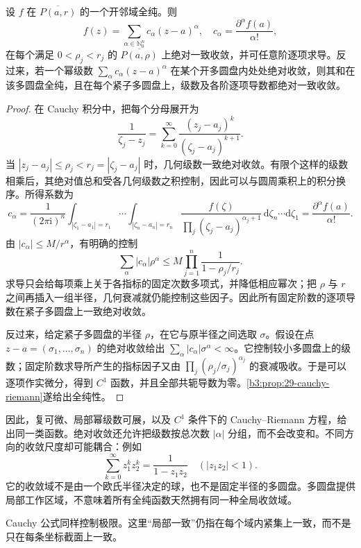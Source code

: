 \begin{theorem}[局部幂级数表示]\label{b3:thm:29-power-series}
设 \(f\) 在 \(\overline{P(a,r)}\) 的一个开邻域全纯。则
\[
 f(z)=\sum_{\alpha\in\mathbb N_0^n}c_\alpha(z-a)^\alpha,
 \quad c_\alpha=\frac{\partial^\alpha f(a)}{\alpha!},
\]
在每个满足 \(0<\rho_j<r_j\) 的 \(\overline{P(a,\rho)}\) 上绝对一致收敛，并可任意阶逐项求导。反过来，若一个幂级数 \(\sum_\alpha c_\alpha(z-a)^\alpha\) 在某个开多圆盘内处处绝对收敛，则其和在该多圆盘全纯，且在每个紧子多圆盘上，级数及各阶逐项导数都绝对一致收敛。
\end{theorem}
\begin{proof}
在 Cauchy 积分中，把每个分母展开为
\[
 \frac1{\zeta_j-z_j}
 =\sum_{k=0}^\infty\frac{(z_j-a_j)^k}{(\zeta_j-a_j)^{k+1}}.
\]
当 \(|z_j-a_j|\le\rho_j<r_j=|\zeta_j-a_j|\) 时，几何级数一致绝对收敛。有限个这样的级数相乘后，其绝对值总和受各几何级数之积控制，因此可以与圆周乘积上的积分换序。所得系数为
\[
 c_\alpha=\frac1{(2\pi\mathrm{i})^n}
 \int_{|\zeta_1-a_1|=r_1}\!\cdots\!
 \int_{|\zeta_n-a_n|=r_n}
 \frac{f(\zeta)}{\prod_j(\zeta_j-a_j)^{\alpha_j+1}}
 \,\mathrm{d}\zeta_n\cdots\mathrm{d}\zeta_1
 =\frac{\partial^\alpha f(a)}{\alpha!}.
\]
由 \(|c_\alpha|\le M/r^\alpha\)，有明确的控制
\[
 \sum_\alpha |c_\alpha|\rho^\alpha
 \le M\prod_{j=1}^n\frac1{1-\rho_j/r_j}.
\]
求导只会给每项乘上关于各指标的固定次数多项式，并降低相应幂次；把 \(\rho\) 与 \(r\) 之间再插入一组半径，几何衰减就仍能控制这些因子。因此所有固定阶数的逐项导数在紧子多圆盘上一致绝对收敛。

反过来，给定紧子多圆盘的半径 \(\rho\)，在它与原半径之间选取 \(\sigma\)。假设在点 \(z-a=(\sigma_1,\ldots,\sigma_n)\) 的绝对收敛给出 \(\sum_\alpha|c_\alpha|\sigma^\alpha<\infty\)。它控制较小多圆盘上的级数；固定阶数求导所产生的指标因子又由 \(\prod_j(\rho_j/\sigma_j)^{\alpha_j}\) 的衰减吸收。于是可以逐项作实微分，得到 \(C^1\) 函数，并且全部共轭导数为零。\cref{b3:prop:29-cauchy-riemann}遂给出全纯性。
\end{proof}

因此，复可微、局部幂级数可展，以及 \(C^1\) 条件下的 Cauchy--Riemann 方程，给出同一类函数。绝对收敛还允许把级数按总次数 \(|\alpha|\) 分组，而不会改变和。不同方向的收敛尺度却可能耦合：例如
\[
 \sum_{k=0}^\infty z_1^kz_2^k=\frac1{1-z_1z_2}
 \quad(|z_1z_2|<1).
\]
它的收敛域不是由一个欧氏半径决定的球，也不是固定半径的多圆盘。多圆盘提供局部工作区域，不意味着所有全纯函数天然拥有同一种全局收敛域。

\ProseParagraphBreak
Cauchy 公式同样控制极限。这里“局部一致”仍指在每个域内紧集上一致，而不是只在每条坐标截面上一致。

